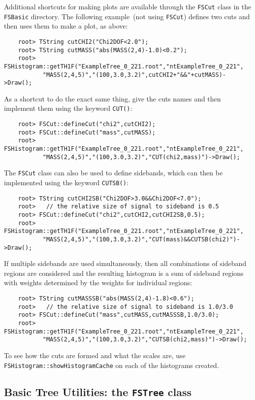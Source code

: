 \documentclass[11pt]{article}
\begin{document}
Additional shortcuts for making plots are available through the {\tt FSCut} class in the {\tt FSBasic} directory.  The following example~(not using {\tt FSCut}) defines two cuts and then uses them to make a plot, as above:
\begin{verbatim}
    root> TString cutCHI2("Chi2DOF<2.0");
    root> TString cutMASS("abs(MASS(2,4)-1.0)<0.2");
    root> FSHistogram::getTH1F("ExampleTree_0_221.root","ntExampleTree_0_221",
           "MASS(2,4,5)","(100,3.0,3.2)",cutCHI2+"&&"+cutMASS)->Draw();
\end{verbatim}
As a shortcut to do the exact same thing, give the cuts names and then implement them using the keyword {\tt CUT()}:
\begin{verbatim}
    root> FSCut::defineCut("chi2",cutCHI2);
    root> FSCut::defineCut("mass",cutMASS);
    root> FSHistogram::getTH1F("ExampleTree_0_221.root","ntExampleTree_0_221",
           "MASS(2,4,5)","(100,3.0,3.2)","CUT(chi2,mass)")->Draw();
\end{verbatim}
The {\tt FSCut} class can also be used to define sidebands, which can then be implemented using the keyword {\tt CUTSB()}:
\begin{verbatim}
    root> TString cutCHI2SB("Chi2DOF>3.0&&Chi2DOF<7.0");
    root>   // the relative size of signal to sideband is 0.5
    root> FSCut::defineCut("chi2",cutCHI2,cutCHI2SB,0.5);
    root> FSHistogram::getTH1F("ExampleTree_0_221.root","ntExampleTree_0_221",
           "MASS(2,4,5)","(100,3.0,3.2)","CUT(mass)&&CUTSB(chi2)")->Draw();
\end{verbatim}
If multiple sidebands are used simultaneously, then all combinations of sideband regions are considered and the resulting histogram is a sum of sideband regions with weights determined by the weights for individual regions:
\begin{verbatim}
    root> TString cutMASSSB("abs(MASS(2,4)-1.8)<0.6");
    root>   // the relative size of signal to sideband is 1.0/3.0
    root> FSCut::defineCut("mass",cutMASS,cutMASSSB,1.0/3.0);
    root> FSHistogram::getTH1F("ExampleTree_0_221.root","ntExampleTree_0_221",
           "MASS(2,4,5)","(100,3.0,3.2)","CUTSB(chi2,mass)")->Draw();
\end{verbatim}

To see how the cuts are formed and what the scales are, use {\tt FSHistogram::showHistogramCache} on each of the histograms created.

\subsection{Basic Tree Utilities: the {\tt FSTree} class}
\label{sec:tree}
\end{document}
